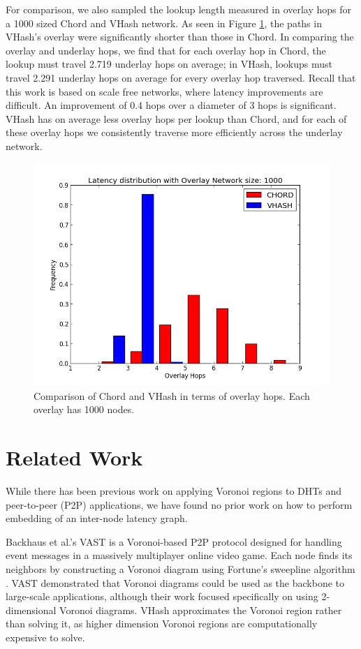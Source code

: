 \documentclass[10pt, conference, letterpaper]{IEEEtran}
\begin{document}
For comparison, we also sampled the lookup length measured in overlay hops for a 1000 sized Chord and VHash network.  As seen in Figure \ref{histover}, the paths in VHash's overlay were significantly shorter than those in Chord. 
In comparing the overlay and underlay hops, we find that for each overlay hop in Chord, the lookup must travel 2.719 underlay hops on average; in VHash, lookups must travel 2.291 underlay hops on average for every overlay hop traversed. 
Recall that this work is based on scale free networks, where latency improvements are difficult.
An improvement of 0.4 hops over a diameter of 3 hops is significant.
VHash has on average less overlay hops per lookup than Chord, and for each of these overlay hops we consistently traverse more efficiently across the underlay network.
\begin{figure}[h]
	\centering
	\includegraphics[width=\linewidth]{hist_overlay_4d}
	\caption{Comparison of Chord and VHash in terms of overlay hops.  Each overlay has 1000 nodes.}
	\label{histover}
\end{figure}

\section{Related Work}
\label{related}
While there has been previous work on applying Voronoi regions to DHTs and peer-to-peer (P2P) applications, we have found no prior work on how to perform embedding of an inter-node latency graph.   

Backhaus et al.'s  VAST \cite{Backhaus:2007:VAS:1326257.1326266} is a Voronoi-based P2P protocol designed for handling event messages in a massively multiplayer online video game.  
Each node finds its neighbors by constructing a Voronoi diagram using Fortune's sweepline algorithm \cite{fortune1987sweepline}.  
VAST demonstrated that Voronoi diagrams could be used as the backbone to large-scale applications, although their work focused specifically on using 2-dimensional Voronoi diagrams.  
VHash approximates the Voronoi region rather than solving it, as higher dimension Voronoi regions are computationally expensive to solve.
\end{document}
